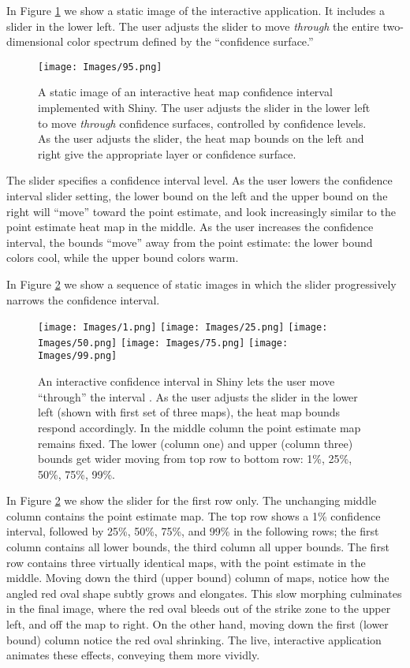 In Figure \ref{fig:Shiny} we show a static image of the interactive application. It includes a slider in the lower left. The user adjusts the slider to move {\it through} the entire two-dimensional color spectrum defined by the ``confidence surface.''
  \begin{figure}[H]
	\centering
	\texttt{[image: Images/95.png]}
	\caption{A static image of an interactive heat map confidence interval implemented with Shiny. The user adjusts the slider in the lower left to move {\it through} confidence surfaces, controlled by confidence levels. As the user adjusts the slider, the heat map bounds on the left and right give the appropriate layer or confidence surface.}
	\label{fig:Shiny}
	\end{figure}
The slider specifies a confidence interval level. As the user lowers the confidence interval slider setting, the lower bound on the left and the upper bound on the right will ``move'' toward the point estimate, and look increasingly similar to the point estimate heat map in the middle. As the user increases the confidence interval, the bounds ``move'' away from the point estimate: the lower bound colors cool, while the upper bound colors warm.

In Figure \ref{fig:sequence} we show a sequence of static images in which the slider progressively narrows the confidence interval.
  \begin{figure}[H]
	\centering
	\texttt{[image: Images/1.png]}
	\texttt{[image: Images/25.png]}
	\texttt{[image: Images/50.png]}
	\texttt{[image: Images/75.png]}
	\texttt{[image: Images/99.png]}
	\caption{An interactive confidence interval in Shiny lets the user move ``through'' the interval \citep{Shiny}. As the user adjusts the slider in the lower left (shown with first set of three maps), the heat map bounds respond accordingly. In the middle column the point estimate map remains fixed. The lower (column one) and upper (column three) bounds get wider moving from top row to bottom row: 1\%, 25\%, 50\%, 75\%, 99\%.}
	\label{fig:sequence}
	\end{figure}
In Figure \ref{fig:sequence} we show the slider for the first row only. The unchanging middle column contains the point estimate map. The top row shows a 1\% confidence interval, followed by 25\%, 50\%, 75\%, and 99\% in the following rows; the first column contains all lower bounds, the third column all upper bounds. The first row contains three virtually identical maps, with the point estimate in the middle. Moving down the third (upper bound) column of maps, notice how the angled red oval shape subtly grows and elongates. This slow morphing culminates in the final image, where the red oval bleeds out of the strike zone to the upper left, and off the map to right. On the other hand, moving down the first (lower bound) column notice the red oval shrinking. The live, interactive application animates these effects, conveying them more vividly.

